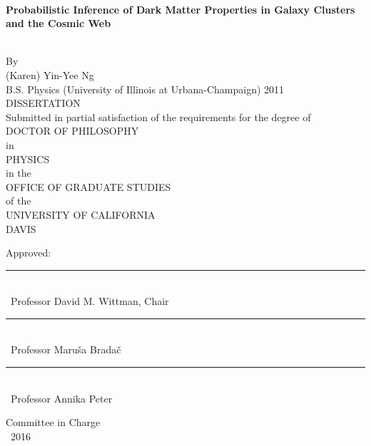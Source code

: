 \singlespacing

~\vspace{-0.5in} %
\begin{center}

  \begin{large}
    {\bf Probabilistic Inference of Dark Matter Properties in Galaxy Clusters
		and the Cosmic Web}
  \end{large}\\\n
  By\\\n
  {\sc (Karen) Yin-Yee Ng}\\
  B.S. Physics (University of Illinois at Urbana-Champaign) 2011\\\n
  DISSERTATION\\\n
  Submitted in partial satisfaction of the requirements for the degree of\\\n
  DOCTOR OF PHILOSOPHY\\\n
  in\\\n
  PHYSICS\\\n
  in the\\\n
  OFFICE OF GRADUATE STUDIES\\\n
  of the\\\n
  UNIVERSITY OF CALIFORNIA\\\n
  DAVIS\\\n\n
  
  Approved:\\\n\n
  
  \rule{4in}{1pt}\\
  ~Professor David M. Wittman, Chair\\ \n\n

  \rule{4in}{1pt}\\
  ~Professor Maru{\v s}a Brada{\v c}\\ \n\n


  \rule{4in}{1pt}\\
  ~Professor Annika Peter\\\n\n

  \vfill
  
  Committee in Charge\\
  ~2016
	\n\n\n
  
\end{center}
